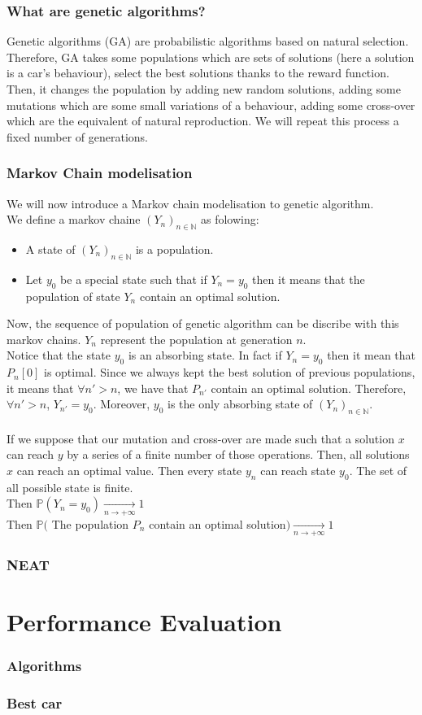 \documentclass[11pt,a4paper]{article}
\newcommand{\mlist}[1]{\begin{itemize}[noitemsep,topsep=0pt]#1\end{itemize}}
\begin{document}
		\section{What are genetic algorithms?}
Genetic algorithms (GA) are probabilistic algorithms based on natural selection. Therefore, GA takes some populations which are sets of solutions (here a solution is a car's behaviour), select the best solutions thanks to the reward function. Then, it changes the population by adding new random solutions, adding some mutations which are some small variations of a behaviour, adding some cross-over which are the equivalent of natural reproduction. We will repeat this process a fixed number of generations.
		
		\section{Markov Chain modelisation}
We will now introduce a Markov chain modelisation to genetic algorithm.\\
We define a markov chaine $(Y_n)_{n\in\mathbb{N}}$ as folowing:
\mlist{
\item A state of $(Y_n)_{n\in\mathbb{N}}$ is a population.
\item Let $y_0$ be a special state such that if $Y_n = y_0$ then it means that the population of state $Y_n$ contain an optimal solution.
}
Now, the sequence of population of genetic algorithm can be discribe with this markov chains. $Y_n$ represent the population at generation $n$.\\
Notice that the state $y_0$ is an absorbing state. In fact if $Y_n = y_0$ then it mean that $P_n[0]$ is optimal. Since we always kept the best solution of previous populations, it means that $\forall n'>n$, we have that $P_{n'}$ contain an optimal solution. Therefore, $\forall n'>n$, $Y_{n'} = y_0$. Moreover, $y_0$ is the only absorbing state of $(Y_n)_{n\in\mathbb{N}}$.\\
\\
If we suppose that our mutation and cross-over are made such that a solution $x$ can reach $y$ by a series of a finite number of those operations. Then, all solutions $x$ can reach an optimal value. Then every state $y_n$ can reach state $y_0$. The set of all possible state is finite.\\
Then $\mathbb{P}(Y_n = y_0) \underset{n \rightarrow +\infty}{\rightarrow} 1$\\
Then $\mathbb{P}($ The population $P_n$ contain an optimal solution$) \underset{n \rightarrow +\infty}{\rightarrow} 1$
		
		\section{NEAT}
	
	
	\part{Performance Evaluation}
		\section{Algorithms}
		
		\section{Best car}
\end{document}
